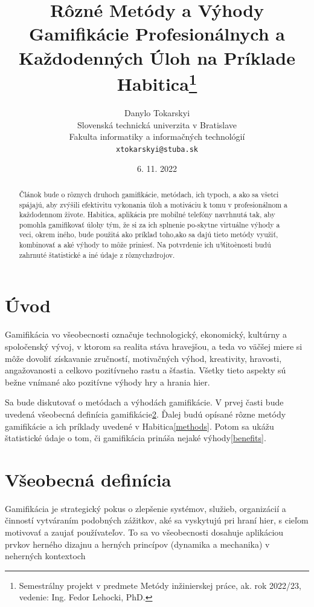 \documentclass[10pt,twoside,slovak,a4paper]{article}
\title{Rôzné Metódy a Výhody Gamifikácie Profesionálnych a Každodenných Úloh na Príklade Habitica\thanks{Semestrálny 
projekt v predmete Metódy inžinierskej práce, ak. rok 2022/23, vedenie: Ing. Fedor Lehocki, PhD.}}
\author{Danylo Tokarskyi\\[2pt]
	{\small Slovenská technická univerzita v Bratislave}\\
	{\small Fakulta informatiky a informačných technológií}\\
	{\small \texttt{xtokarskyi@stuba.sk}}
	}
\date{\small 6. 11. 2022 } %
\begin{document}
\maketitle

\begin{abstract}
	Článok bude o rôznych druhoch gamifikácie, metódach, ich typoch, a ako sa všetci spájajú, aby zvýšili efektivitu 
	vykonania úloh a motiváciu k tomu v profesionálnom a každodennom živote. Habitica, aplikácia pre mobilné telefóny 
	navrhnutá tak, aby pomohla gamifikovať úlohy tým, že si za ich splnenie po-skytne virtuálne výhody a veci, okrem 
	iného, bude použitá ako príklad toho,ako sa dajú tieto metódy využiť, kombinovať a aké výhody to môže priniesť.
	Na potvrdenie ich u¾itoènosti budú zahrnuté štatistické a iné údaje z rôznychzdrojov.
\end{abstract}



\section{Úvod}

Gamifikácia vo všeobecnosti označuje technologický, ekonomický, kultúrny a spoločenský vývoj, v 
ktorom sa realita stáva hravejšou, a teda vo väčšej miere si môže dovoliť získavanie zručností, 
motivačných výhod, kreativity, hravosti, angažovanosti a celkovo pozitívneho rastu a šťastia. 
Všetky tieto aspekty sú bežne vnímané ako pozitívne výhody hry a hrania hier.\cite{Gamification}

Sa bude diskutovať o metódach a výhodách gamifikácie. 
V prvej časti bude 
uvedená všeobecná definícia 
gamifikácie\ref{definition}. Ďalej budú opísané rôzne metódy gamifikácie 
a ich príklady uvedené v Habitica\ref{methods}. 
Potom sa ukážu štatistické údaje o tom, či gamifikácia 
prináša nejaké výhody\ref{benefits}.



\section{Všeobecná definícia} \label{definition}

Gamifikácia je strategický pokus o zlepšenie systémov, služieb, organizácií a činností vytváraním podobných zážitkov, aké sa vyskytujú pri hraní hier, s cieľom motivovať a zaujať používateľov\cite{Gamification}. To sa vo všeobecnosti dosahuje aplikáciou prvkov herného dizajnu a herných princípov (dynamika a mechanika) v neherných kontextoch\cite{Defining}
\end{document}
